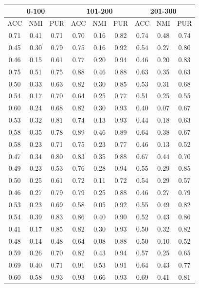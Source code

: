 \documentclass[10pt,final]{IEEEtran}
\begin{document}
\begin{center}
\begin{table}[h!]
\begin{tabular}{|c|c|c|c|c|c|c|c|c|}
    \hline
    \multicolumn{3}{|c|}{0-100} & \multicolumn{3}{|c|}{101-200} & \multicolumn{3}{|c|}{201-300}\\
    \hline
    ACC & NMI & PUR & ACC & NMI & PUR & ACC & NMI & PUR\\
    \hline
    0.71 & 0.41 & 0.71 & 0.70 & 0.16 & 0.82 & 0.74 & 0.48 & 0.74\\
    0.45 & 0.30 & 0.79 & 0.75 & 0.16 & 0.92 & 0.54 & 0.27 & 0.80\\
    0.46 & 0.15 & 0.61 & 0.77 & 0.20 & 0.94 & 0.46 & 0.20 & 0.83\\
    0.75 & 0.51 & 0.75 & 0.88 & 0.46 & 0.88 & 0.63 & 0.35 & 0.63\\
    0.50 & 0.33 & 0.63 & 0.82 & 0.30 & 0.85 & 0.53 & 0.31 & 0.68\\
    0.54 & 0.17 & 0.70 & 0.64 & 0.25 & 0.77 & 0.51 & 0.25 & 0.55\\
    0.60 & 0.24 & 0.68 & 0.82 & 0.30 & 0.93 & 0.40 & 0.07 & 0.67\\
    0.53 & 0.32 & 0.81 & 0.74 & 0.13 & 0.93 & 0.44 & 0.18 & 0.63\\
    0.58 & 0.35 & 0.78 & 0.89 & 0.46 & 0.89 & 0.64 & 0.38 & 0.67\\
    0.58 & 0.23 & 0.71 & 0.75 & 0.23 & 0.77 & 0.46 & 0.13 & 0.52\\
    0.47 & 0.34 & 0.80 & 0.83 & 0.35 & 0.88 & 0.67 & 0.44 & 0.70\\
    0.49 & 0.23 & 0.53 & 0.76 & 0.28 & 0.94 & 0.55 & 0.29 & 0.85\\
    0.50 & 0.25 & 0.61 & 0.72 & 0.11 & 0.72 & 0.54 & 0.29 & 0.57\\
    0.46 & 0.27 & 0.79 & 0.79 & 0.25 & 0.88 & 0.46 & 0.27 & 0.79\\
    0.53 & 0.23 & 0.69 & 0.58 & 0.05 & 0.92 & 0.55 & 0.49 & 0.82\\
    0.54 & 0.39 & 0.83 & 0.86 & 0.40 & 0.90 & 0.52 & 0.43 & 0.86\\
    0.41 & 0.17 & 0.85 & 0.82 & 0.30 & 0.93 & 0.50 & 0.32 & 0.82\\
    0.48 & 0.14 & 0.48 & 0.64 & 0.08 & 0.88 & 0.50 & 0.10 & 0.52\\
    0.59 & 0.26 & 0.70 & 0.82 & 0.43 & 0.94 & 0.57 & 0.25 & 0.65\\
    0.69 & 0.40 & 0.71 & 0.91 & 0.53 & 0.91 & 0.64 & 0.43 & 0.77\\
    0.60 & 0.58 & 0.93 & 0.93 & 0.66 & 0.93 & 0.69 & 0.41 & 0.81\\

\end{tabular}
\end{table}
\end{center}
\end{document}
